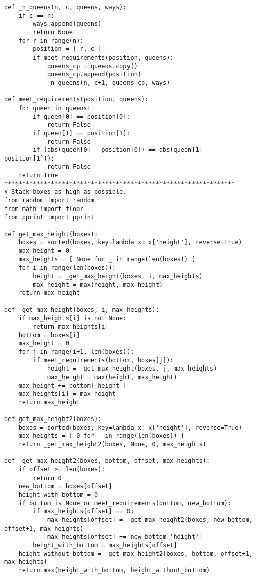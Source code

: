\documentclass[12pt]{article}
\begin{document}
\begin{lstlisting}
def _n_queens(n, c, queens, ways):
    if c == n:
        ways.append(queens)
        return None
    for r in range(n):
        position = [ r, c ]
        if meet_requirements(position, queens):
            queens_cp = queens.copy()
            queens_cp.append(position)
            _n_queens(n, c+1, queens_cp, ways)

def meet_requirements(position, queens):
    for queen in queens:
        if queen[0] == position[0]:
            return False
        if queen[1] == position[1]:
            return False
        if (abs(queen[0] - position[0]) == abs(queen[1] - position[1])):
            return False
    return True
****************************************************************
# Stack boxes as high as possible.
from random import random
from math import floor
from pprint import pprint

def get_max_height(boxes):
    boxes = sorted(boxes, key=lambda x: x['height'], reverse=True)
    max_height = 0
    max_heights = [ None for _ in range(len(boxes)) ]
    for i in range(len(boxes)):
        height = _get_max_height(boxes, i, max_heights)
        max_height = max(height, max_height)
    return max_height

def _get_max_height(boxes, i, max_heights):
    if max_heights[i] is not None:
        return max_heights[i]
    bottom = boxes[i]
    max_height = 0
    for j in range(i+1, len(boxes)):
        if meet_requirements(bottom, boxes[j]):
            height = _get_max_height(boxes, j, max_heights)
            max_height = max(height, max_height)
    max_height += bottom['height']
    max_heights[i] = max_height
    return max_height

def get_max_height2(boxes):
    boxes = sorted(boxes, key=lambda x: x['height'], reverse=True)
    max_heights = [ 0 for _ in range(len(boxes)) ]
    return _get_max_height2(boxes, None, 0, max_heights)

def _get_max_height2(boxes, bottom, offset, max_heights):
    if offset >= len(boxes):
        return 0
    new_bottom = boxes[offset]
    height_with_bottom = 0
    if bottom is None or meet_requirements(bottom, new_bottom):
        if max_heights[offset] == 0:
            max_heights[offset] = _get_max_height2(boxes, new_bottom, offset+1, max_heights)
            max_heights[offset] += new_bottom['height']
        height_with_bottom = max_heights[offset]
    height_without_bottom = _get_max_height2(boxes, bottom, offset+1, max_heights)
    return max(height_with_bottom, height_without_bottom)


\end{lstlisting}
\end{document}
